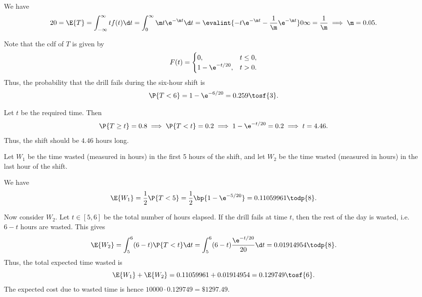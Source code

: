 \begin{solution}
    \begin{ppart}
        We have \[20 = \E{T} = \int_{-\infty}^\infty t f(t) \d t = \int_0^\infty \m t \e^{-\m t} \d t = \evalint{-t\e^{-\m t} - \frac1\m \e^{-\m t}}0\infty = \frac1\m \implies \m = 0.05.\]
    \end{ppart}
    \begin{ppart}
        Note that the cdf of $T$ is given by \[F(t) = \begin{cases}
            0, & t \leq 0,\\
            1 - \e^{-t/20}, & t > 0.
        \end{cases}\] Thus, the probability that the drill fails during the six-hour shift is \[\P{T < 6} = 1 - \e^{-6/20} = 0.259 \tosf{3}.\]
    \end{ppart}
    \begin{ppart}
        Let $t$ be the required time. Then \[\P{T \geq t} = 0.8 \implies \P{T < t} = 0.2 \implies 1 - \e^{-t/20} = 0.2 \implies t = 4.46.\] Thus, the shift should be $4.46$ hours long.
    \end{ppart}
    \begin{ppart}
        Let $W_1$ be the time wasted (measured in hours) in the first 5 hours of the shift, and let $W_2$ be the time wasted (measured in hours) in the last hour of the shift.

        We have \[\E{W_1} = \frac12 \P{T < 5} = \frac12 \bp{1 - \e^{-5/20}} = 0.11059961 \todp{8}.\]

        Now consider $W_2$. Let $t \in [5, 6]$ be the total number of hours elapsed. If the drill fails at time $t$, then the rest of the day is wasted, i.e. $6-t$ hours are wasted. This gives \[\E{W_2} = \int_5^6 (6-t) \P{T < t} \d t = \int_5^6 (6-t) \frac{\e^{-t/20}}{20} \d t = 0.01914954 \todp{8}.\] Thus, the total expected time wasted is \[\E{W_1} + \E{W_2} = 0.11059961 + 0.01914954 = 0.129749 \tosf{6}.\] The expected cost due to wasted time is hence $10000 \cdot 0.129749 = \$ 1297.49$.
    \end{ppart}
\end{solution}

